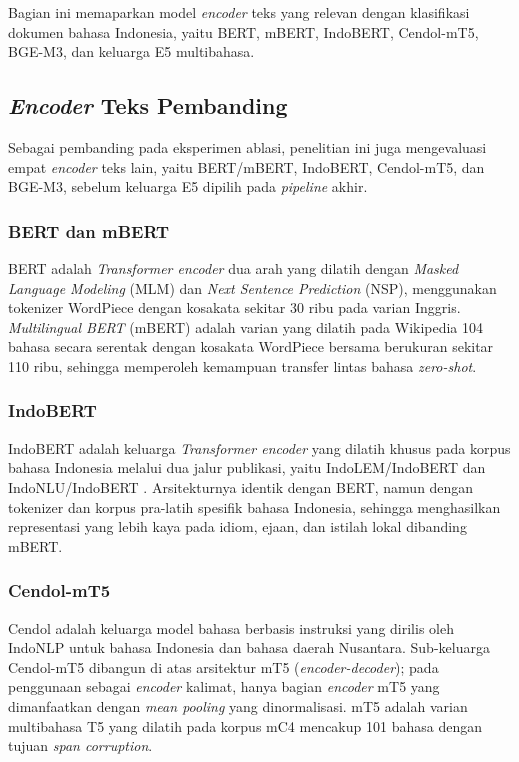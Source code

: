 Bagian ini memaparkan model \textit{encoder} teks yang relevan dengan klasifikasi dokumen bahasa Indonesia, yaitu BERT, mBERT, IndoBERT, Cendol-mT5, BGE-M3, dan keluarga E5 multibahasa.

\subsection{\textit{Encoder} Teks Pembanding}
\label{sec:textencoder-pembanding}

Sebagai pembanding pada eksperimen ablasi, penelitian ini juga mengevaluasi empat \textit{encoder} teks lain, yaitu BERT/mBERT, IndoBERT, Cendol-mT5, dan BGE-M3, sebelum keluarga E5 dipilih pada \textit{pipeline} akhir.

\subsubsection{BERT dan mBERT}

BERT \citep{devlinBERT2019} adalah \textit{Transformer encoder} dua arah yang dilatih dengan \textit{Masked Language Modeling} (MLM) dan \textit{Next Sentence Prediction} (NSP), menggunakan tokenizer WordPiece dengan kosakata sekitar 30 ribu pada varian Inggris. \textit{Multilingual BERT} (mBERT) adalah varian yang dilatih pada Wikipedia 104 bahasa secara serentak dengan kosakata WordPiece bersama berukuran sekitar 110 ribu, sehingga memperoleh kemampuan transfer lintas bahasa \textit{zero-shot}.

\subsubsection{IndoBERT}

IndoBERT \citep{kotoIndoLEM2020,wilieIndoNLU2020} adalah keluarga \textit{Transformer encoder} yang dilatih khusus pada korpus bahasa Indonesia melalui dua jalur publikasi, yaitu IndoLEM/IndoBERT \citep{kotoIndoLEM2020} dan IndoNLU/IndoBERT \citep{wilieIndoNLU2020}. Arsitekturnya identik dengan BERT, namun dengan tokenizer dan korpus pra-latih spesifik bahasa Indonesia, sehingga menghasilkan representasi yang lebih kaya pada idiom, ejaan, dan istilah lokal dibanding mBERT.

\subsubsection{Cendol-mT5}

Cendol \citep{cahyawijayaCendol2024} adalah keluarga model bahasa berbasis instruksi yang dirilis oleh IndoNLP untuk bahasa Indonesia dan bahasa daerah Nusantara. Sub-keluarga Cendol-mT5 dibangun di atas arsitektur mT5 (\textit{encoder-decoder}); pada penggunaan sebagai \textit{encoder} kalimat, hanya bagian \textit{encoder} mT5 yang dimanfaatkan dengan \textit{mean pooling} yang dinormalisasi. mT5 \citep{xueMT52021} adalah varian multibahasa T5 yang dilatih pada korpus mC4 mencakup 101 bahasa dengan tujuan \textit{span corruption}.

